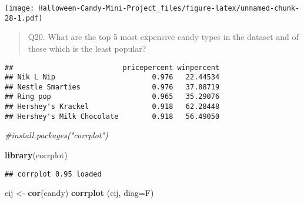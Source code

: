 \documentclass[
]{article}
\newenvironment{Shaded}{\begin{snugshade}}{\end{snugshade}}
\newcommand{\AttributeTok}[1]{\textcolor[rgb]{0.13,0.29,0.53}{#1}}
\newcommand{\CommentTok}[1]{\textcolor[rgb]{0.56,0.35,0.01}{\textit{#1}}}
\newcommand{\ConstantTok}[1]{\textcolor[rgb]{0.56,0.35,0.01}{#1}}
\newcommand{\DecValTok}[1]{\textcolor[rgb]{0.00,0.00,0.81}{#1}}
\newcommand{\FunctionTok}[1]{\textcolor[rgb]{0.13,0.29,0.53}{\textbf{#1}}}
\newcommand{\NormalTok}[1]{#1}
\newcommand{\OtherTok}[1]{\textcolor[rgb]{0.56,0.35,0.01}{#1}}
\newcommand{\SpecialCharTok}[1]{\textcolor[rgb]{0.81,0.36,0.00}{\textbf{#1}}}
\begin{document}
\texttt{[image: Halloween-Candy-Mini-Project\_files/figure-latex/unnamed-chunk-28-1.pdf]}

\begin{quote}
Q20. What are the top 5 most expensive candy types in the dataset and of
these which is the least popular?
\end{quote}

\begin{Shaded}
\end{Shaded}

\begin{verbatim}
##                          pricepercent winpercent
## Nik L Nip                       0.976   22.44534
## Nestle Smarties                 0.976   37.88719
## Ring pop                        0.965   35.29076
## Hershey's Krackel               0.918   62.28448
## Hershey's Milk Chocolate        0.918   56.49050
\end{verbatim}

\begin{Shaded}
\begin{Highlighting}[]
\CommentTok{\#install.packages("corrplot")}
\end{Highlighting}
\end{Shaded}

\begin{Shaded}
\begin{Highlighting}[]
\FunctionTok{library}\NormalTok{(corrplot)}
\end{Highlighting}
\end{Shaded}

\begin{verbatim}
## corrplot 0.95 loaded
\end{verbatim}

\begin{Shaded}
\begin{Highlighting}[]
\NormalTok{cij }\OtherTok{\textless{}{-}} \FunctionTok{cor}\NormalTok{(candy)}
\FunctionTok{corrplot}\NormalTok{ (cij, }\AttributeTok{diag=}\NormalTok{F)}
\end{Highlighting}
\end{Shaded}
\end{document}
